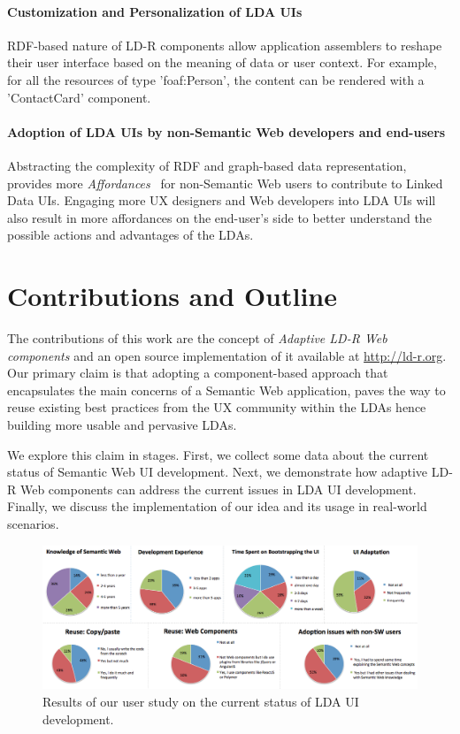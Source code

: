 \documentclass{acm_proc_article-sp}
\begin{document}
\paragraph{Customization and Personalization of LDA UIs} 
RDF-based nature of LD-R components allow application assemblers to reshape their user interface based on the meaning of data or user context.
For example, for all the resources of type 'foaf:Person', the content can be rendered with a 'ContactCard' component.

\paragraph{Adoption of LDA UIs by non-Semantic Web developers and end-users} 
Abstracting the complexity of RDF and graph-based data representation, provides more \emph{Affordances}~\cite{Norman2013} for non-Semantic Web users to contribute to Linked Data UIs.
Engaging more UX designers and Web developers into LDA UIs will also result in more affordances on the end-user's side to better understand the possible actions and advantages of the LDAs.

\section{Contributions and Outline}
The contributions of this work are the concept of \emph{Adaptive LD-R Web components} and an open source implementation of it available at \url{http://ld-r.org}.
Our primary claim is that adopting a component-based approach that encapsulates the main concerns of a Semantic Web application, paves the way to reuse existing best practices from the UX community within the LDAs hence building more usable and pervasive LDAs.

We explore this claim in stages.
First, we collect some data about the current status of Semantic Web UI development.
Next, we demonstrate how adaptive LD-R Web components can address the current issues in LDA UI development.
Finally, we discuss the implementation of our idea and its usage in real-world scenarios.

\begin{figure}[tb]
  \includegraphics[width=1\linewidth]{images/userstudy.png}
  \caption{Results of our user study on the current status of LDA UI development.}
  \label{fig:userstudy}
\end{figure}
\end{document}
